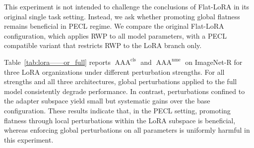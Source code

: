 \documentclass[10pt]{article} %
\begin{document}
\begin{table}[thpb]
\centering
\caption{$\operatorname{AAA}^{\mathrm{cls}}$ and $\operatorname{AAA}^{\mathrm{nme}}$ on ImageNet-R under local global (full model) versus (LoRA only).}
\label{tab:lora——or_full}
\setlength{\tabcolsep}{3pt}
\renewcommand{\arraystretch}{0.8}
\end{table}


This experiment is not intended to challenge the conclusions of Flat-LoRA in its original single task setting. Instead, we ask whether promoting global flatness remains beneficial in PECL regime. We compare the original Flat-LoRA configuration, which applies RWP to all model parameters, with a PECL compatible variant that restricts RWP to the LoRA branch only.

Table~\ref{tab:lora——or_full} reports $\operatorname{AAA}^{\mathrm{cls}}$ and $\operatorname{AAA}^{\mathrm{nme}}$ on ImageNet-R for three LoRA organizations under different perturbation strengths. For all strengths and all three architectures, global perturbations applied to the full model consistently degrade performance. In contrast, perturbations confined to the adapter subspace yield small but systematic gains over the base configuration. These results indicate that, in the PECL setting, promoting flatness through local perturbations within the LoRA subspace is beneficial, whereas enforcing global perturbations on all parameters is uniformly harmful in this experiment.
\end{document}
